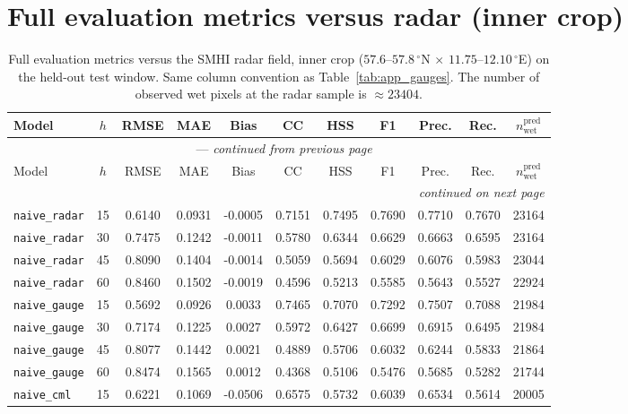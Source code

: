 \documentclass[12pt, a4paper]{article}
\begin{document}
\section{Full evaluation metrics versus radar (inner crop)}\label{app:radar_inner}

{\footnotesize
\begin{longtable}{p{4.0cm}cccccccccc}
\caption{Full evaluation metrics versus the SMHI radar field, inner crop ($57.6$--$57.8\,^\circ$N $\times$ $11.75$--$12.10\,^\circ$E) on the held-out test window. Same column convention as Table~\ref{tab:app_gauges}. The number of observed wet pixels at the radar sample is $\approx 23404$.}\label{tab:app_radar_inner} \\
\toprule
Model & $h$ & RMSE & MAE & Bias & CC & HSS & F1 & Prec. & Rec. & $n_{\text{wet}}^{\text{pred}}$ \\
\midrule
\endfirsthead
\multicolumn{11}{c}{\tablename\ \thetable{} --- \textit{continued from previous page}} \\
\toprule
Model & $h$ & RMSE & MAE & Bias & CC & HSS & F1 & Prec. & Rec. & $n_{\text{wet}}^{\text{pred}}$ \\
\midrule
\endhead
\midrule
\multicolumn{11}{r}{\textit{continued on next page}} \\
\endfoot
\bottomrule
\endlastfoot
\texttt{naive\_radar} & 15 & 0.6140 & 0.0931 & -0.0005 & 0.7151 & 0.7495 & 0.7690 & 0.7710 & 0.7670 & 23164 \\
\texttt{naive\_radar} & 30 & 0.7475 & 0.1242 & -0.0011 & 0.5780 & 0.6344 & 0.6629 & 0.6663 & 0.6595 & 23164 \\
\texttt{naive\_radar} & 45 & 0.8090 & 0.1404 & -0.0014 & 0.5059 & 0.5694 & 0.6029 & 0.6076 & 0.5983 & 23044 \\
\texttt{naive\_radar} & 60 & 0.8460 & 0.1502 & -0.0019 & 0.4596 & 0.5213 & 0.5585 & 0.5643 & 0.5527 & 22924 \\
\addlinespace[1pt]
\texttt{naive\_gauge} & 15 & 0.5692 & 0.0926 & 0.0033 & 0.7465 & 0.7070 & 0.7292 & 0.7507 & 0.7088 & 21984 \\
\texttt{naive\_gauge} & 30 & 0.7174 & 0.1225 & 0.0027 & 0.5972 & 0.6427 & 0.6699 & 0.6915 & 0.6495 & 21984 \\
\texttt{naive\_gauge} & 45 & 0.8077 & 0.1442 & 0.0021 & 0.4889 & 0.5706 & 0.6032 & 0.6244 & 0.5833 & 21864 \\
\texttt{naive\_gauge} & 60 & 0.8474 & 0.1565 & 0.0012 & 0.4368 & 0.5106 & 0.5476 & 0.5685 & 0.5282 & 21744 \\
\addlinespace[1pt]
\texttt{naive\_cml} & 15 & 0.6221 & 0.1069 & -0.0506 & 0.6575 & 0.5732 & 0.6039 & 0.6534 & 0.5614 & 20005 \\

\end{longtable}}
\end{document}
